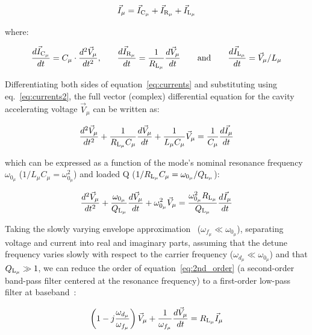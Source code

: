 \documentclass[a4paper,12pt]{article}
\begin{document}
\begin{equation}
  \centering \vec I_{\mu} = \vec I_{\rm C_{\mu}} + \vec I_{\rm R_{\mu}} + \vec I_{\rm L_{\mu}}
  \label{eq:currents}
\end{equation}

\noindent where:

\begin{equation}
  \frac{d\vec I_{\rm C_{\mu}}}{dt} = C_{\mu} \cdot \frac{d^2\vec V_{\mu}}{dt^2}\text{,}\qquad \frac{d\vec I_{\rm R_{\mu}}}{dt} = \frac{1}{R_{\rm L_{\mu}}}\frac{d\vec V_{\mu}}{dt} \qquad \text{and}\qquad \frac{d\vec I_{\rm L_{\mu}}}{dt} = \vec V_{\mu}/L_{\mu}
  \label{eq:currents2}
\end{equation}

Differentiating both sides of equation~\ref{eq:currents} and substituting using eq.~\ref{eq:currents2}, the full vector (complex) differential equation for the cavity accelerating voltage $\vec V_{\mu}$ can be written as:

\begin{equation}
  \frac{d^2\vec V_{\mu}}{dt^2} + \frac{1}{R_{\rm L_{\mu}}C_{\mu}}\frac{d\vec V_{\mu}}{dt} + \frac{1}{L_{\mu}C_{\mu}}\vec V_{\mu} = \frac{1}{C_{\mu}}\frac{d\vec I_{\mu}}{dt}
\end{equation}

\noindent which can be expressed as a function of the mode's nominal resonance frequency $\omega_{0_{\mu}}$ ($1/L_{\mu}C_{\mu}=\omega_{0_{\mu}}^2$) and loaded Q ($1/R_{\rm L_{\mu}}C_{\mu}=\omega_{0_{\mu}}/Q_{\rm L_{\mu}}$):
 
\begin{equation}
  \frac{d^2\vec V_{\mu}}{dt^2} + \frac{\omega_{0_{\mu}}}{Q_{\rm L_{\mu}}}\frac{d\vec V_{\mu}}{dt} + \omega_{0_{\mu}}^2 \vec V_{\mu} = \frac{\omega_{0_{\mu}}^2 R_{\rm L_{\mu}}}{Q_{\rm L_{\mu}}}\frac{d\vec I_{\mu}}{dt}
  \label{eq:2nd_order}
\end{equation}

Taking the slowly varying envelope approximation~\cite{ref:svea} ($\omega_{f_{\mu}} \ll \omega_{0_{\mu}}$), separating voltage and current into real and imaginary parts, assuming that the detune frequency varies slowly with respect to the carrier frequency ($\omega_{d_{\mu}} \ll \omega_{0_{\mu}}$) and that $Q_{\rm L_{\mu}} \gg 1$, we can reduce the order of equation~\ref{eq:2nd_order} (a second-order band-pass filter centered at the resonance frequency) to a first-order low-pass filter at baseband~\cite{ref:schilcher}:

\begin{equation}
  \left(1-j\frac{\omega_{d_{\mu}}}{\omega_{f_{\mu}}}\right)\vec V_{\mu} + \frac{1}{\omega_{f_{\mu}}}\frac{d\vec V_{\mu}}{dt} = R_{\rm L_{\mu}} \vec I_{\mu}
  \label{eq:1st_order1}
\end{equation}
\end{document}
